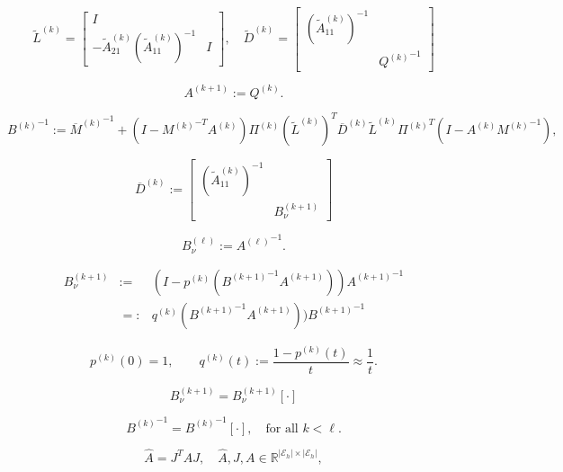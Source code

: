 \documentclass[11pt]{article}
\begin{document}
\begin{equation}\label{factorizationKl}
\widetilde{L}^{(k)} =
\left [
\begin{array}{cc}
I & \\
-\widetilde{A}^{(k)}_{21} (\widetilde{A}^{(k)}_{11})^{-1} & I
\end{array}
\right ] , \quad
\widetilde{D}^{(k)} =
\left [
\begin{array}{cc}
(\widetilde{A}^{(k)}_{11})^{-1} & \\
& {Q^{(k)}}^{-1}
\end{array}
\right ] 
\end{equation}

\begin{equation}\label{factorizationK2}
 A^{(k+1)}:=Q^{(k)}.
\end{equation}

\begin{equation}\label{multigrid_preconditioner}
{B^{(k)}}^{-1} := 
{\overline{M}^{(k)}}^{-1} + (I - {M^{(k)}}^{-T} A^{(k)})
\Pi^{(k)} 
 (\widetilde{L}^{(k)})^T  \overline{D}^{(k)}
\widetilde{L}^{(k)} {\Pi^{(k)}}^T (I - A^{(k)} {M^{(k)}}^{-1}),
 \end{equation}

\begin{equation}
\overline{D}^{(k)} :=
\left [
\begin{array}{cc}
(\widetilde{A}^{(k)}_{11})^{-1} & \\
& B_{\nu}^{(k+1)}
\end{array}
\right ]
\end{equation}

\begin{equation}
B_{\nu}^{(\ell)} := {A^{(\ell)}}^{-1}.
\end{equation}

$$
\begin{array}{ccc}
 B_{\nu}^{(k+1)} & := & (I-p^{(k)}({B^{(k+1)}}^{-1}A^{(k+1)})){A^{(k+1)}}^{-1} \\
 & =: & q^{(k)}({B^{(k+1)}}^{-1}A^{(k+1)})){B^{(k+1)}}^{-1}
\end{array}
$$

$$
p^{(k)}(0)=1,\qquad q^{(k)}(t):=\frac{1-p^{(k)}(t)}{t}\approx \frac{1}{t}.
$$

$$B_{\nu}^{(k+1)}=B_{\nu}^{(k+1)}[\cdot]$$

$${B^{(k)}}^{-1}={B^{(k)}}^{-1}[\cdot], \quad \mbox{for all } k<\ell.$$

\begin{equation}\label{eq:A_hat}
 \widehat{A}=J^T A J, \quad  
\widehat{A}, J,  A  \in {\mathbb{R}}^{ |{\mathcal E}_h| \times  |{\mathcal E}_h| },
\end{equation}
\end{document}
